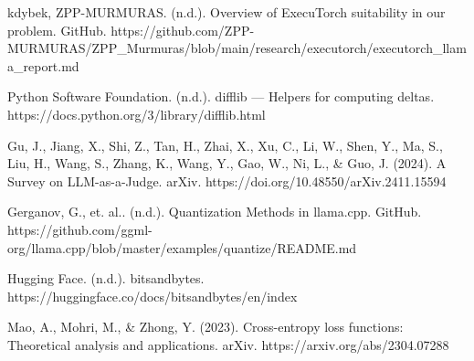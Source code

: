 \documentclass[licencjacka,en]{pracamgr}
\begin{document}
\begin{thebibliography}{99}
kdybek, ZPP-MURMURAS. (n.d.). Overview of ExecuTorch suitability in our problem. GitHub. https://github.com/ZPP-MURMURAS/ZPP\_Murmuras/blob/main/research/executorch/executorch\_llama\_report.md

Python Software Foundation. (n.d.). difflib — Helpers for computing deltas. https://docs.python.org/3/library/difflib.html

Gu, J., Jiang, X., Shi, Z., Tan, H., Zhai, X., Xu, C., Li, W., Shen, Y., Ma, S., Liu, H., Wang, S., Zhang, K., Wang, Y., Gao, W., Ni, L., \& Guo, J. (2024). A Survey on LLM-as-a-Judge. arXiv. https://doi.org/10.48550/arXiv.2411.15594

Gerganov, G., et. al.. (n.d.). Quantization Methods in llama.cpp. GitHub. https://github.com/ggml-org/llama.cpp/blob/master/examples/quantize/README.md

Hugging Face. (n.d.). bitsandbytes. https://huggingface.co/docs/bitsandbytes/en/index

Mao, A., Mohri, M., \& Zhong, Y. (2023). Cross-entropy loss functions: Theoretical analysis and applications. arXiv. https://arxiv.org/abs/2304.07288


\end{thebibliography}
\end{document}
